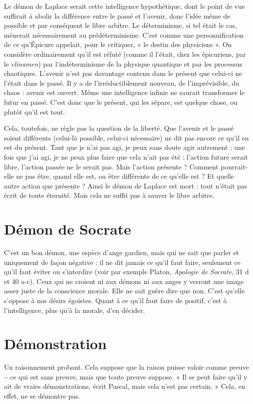 Le démon de Laplace serait cette intelligence hypothétique, dont le point
de vue suffirait à abolir la différence entre le passé et l’avenir, donc l’idée même
de possible et par conséquent le libre arbitre. Le déterminisme, si tel était le cas,
mènerait nécessairement au prédéterminisme. C’est comme une personnification
de ce qu'Épicure appelait, pour le critiquer, « le destin des physiciens ».
On considère ordinairement qu’il est réfuté (comme il l'était, chez les épicuriens,
par le {\it clinamen}) par l’indéterminisme de la physique quantique et par les
processus chaotiques. L'avenir n’est pas davantage contenu dans le présent que
celui-ci ne l'était dans le passé. Il y a de l’irréductiblement nouveau, de l’imprévisible,
du chaos : avenir est ouvert. Même une intelligence infinie ne saurait
transformer le futur en passé. C’est donc que le présent, qui les sépare, est
quelque chose, ou plutôt qu’il est tout.

Cela, toutefois, ne règle pas la question de la liberté. Que l’avenir et le passé
soient différents (celui-là possible, celui-ci nécessaire) ne dit pas encore ce qu’il
en est du présent. Tant que je n’ai pas agi, je peux sans doute agir autrement ;
une fois que j'ai agi, je ne peux plus faire que cela n’ait pas été : l’action future
serait libre, l’action passée ne le serait pas. Mais l’action présente ? Comment
pourrait-elle ne pas être, quand elle est, ou être différente de ce qu’elle est ? Et
quelle autre action que présente ? Ainsi le démon de Laplace est mort : tout
n’était pas écrit de toute éternité. Mais cela ne suffit pas à sauver le libre arbitre.

\section{Démon de Socrate}
C’est un bon démon, une espèce d’ange gardien,
mais qui ne sait que parler et uniquement de
façon négative : il ne dit jamais ce qu’il faut faire, seulement ce qu’il faut éviter
ou s’interdire (voir par exemple Platon, {\it Apologie de Socrate}, 31 d et 40 a-c).
Ceux qui ne croient ni aux démons ni aux anges y verront une image assez juste
de la conscience morale. Elle ne sait guère dire que non. C’est qu’elle s’oppose
à nos désirs égoïstes. Quant à ce qu’il faut faire de positif, c’est à l’intelligence,
plus qu’à la morale, d’en décider.

\section{Démonstration}
Un raisonnement probant. Cela suppose que la raison
puisse valoir comme preuve {\bf --} ce qui est sans preuve,
mais que toute preuve suppose. « Il se peut faire qu’il y ait de vraies démonstrations,
écrit Pascal, mais cela n’est pas certain. » Cela, en effet, ne se démontre
pas.

